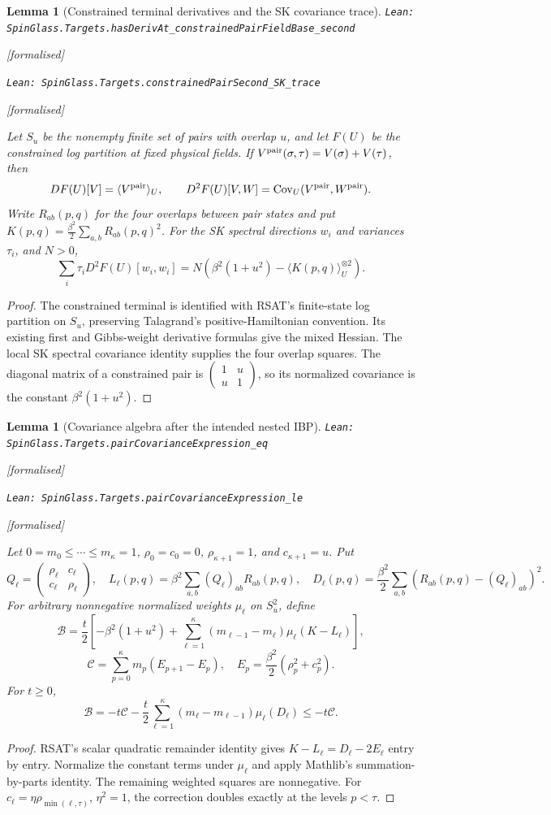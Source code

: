 \documentclass[11pt]{article}
\providecommand{\lean}[1]{\leavevmode\par\nopagebreak
  {\noindent\normalfont\footnotesize\raggedright\texttt{Lean: #1}\par}\nopagebreak}
\providecommand{\leanok}{\par\nopagebreak
  {\noindent\normalfont\footnotesize\textcolor{green!50!black}{[formalised]}\par}\nopagebreak}
\newtheorem{lemma}[theorem]{Lemma}
\begin{document}
\begin{lemma}[Constrained terminal derivatives and the SK covariance trace]
\lean{SpinGlass.Targets.hasDerivAt\_constrainedPairFieldBase\_second}\leanok
\lean{SpinGlass.Targets.constrainedPairSecond\_SK\_trace}\leanok
Let $S_u$ be the nonempty finite set of pairs with overlap $u$, and let $F(U)$
be the constrained log partition at fixed physical fields. If
$V^{\rm pair}(\sigma,\tau)=V(\sigma)+V(\tau)$, then
\[
D F(U)[V]=\langle V^{\rm pair}\rangle_U,\qquad
D^2 F(U)[V,W]=\operatorname{Cov}_U(V^{\rm pair},W^{\rm pair}).
\]
Write $R_{ab}(p,q)$ for the four overlaps between pair states and put
$K(p,q)=\frac{\beta^2}{2}\sum_{a,b}R_{ab}(p,q)^2$.
For the SK spectral directions $w_i$ and variances $\tau_i$, and $N>0$,
\[
\sum_i\tau_i D^2F(U)[w_i,w_i]
=N\left(\beta^2(1+u^2)-\langle K(p,q)\rangle_U^{\otimes2}\right).
\]
\end{lemma}
\begin{proof}
The constrained terminal is identified with RSAT's finite-state log partition
on $S_u$, preserving Talagrand's positive-Hamiltonian convention. Its existing
first and Gibbs-weight derivative formulas give the mixed Hessian. The local
SK spectral covariance identity supplies the four overlap squares. The diagonal
matrix of a constrained pair is $\left(\begin{smallmatrix}1&u\\u&1\end{smallmatrix}\right)$,
so its normalized covariance is the constant $\beta^2(1+u^2)$.
\end{proof}

\begin{lemma}[Covariance algebra after the intended nested IBP]
\lean{SpinGlass.Targets.pairCovarianceExpression\_eq}\leanok
\lean{SpinGlass.Targets.pairCovarianceExpression\_le}\leanok
Let $0=m_0\le\cdots\le m_\kappa=1$, $\rho_0=c_0=0$,
$\rho_{\kappa+1}=1$, and $c_{\kappa+1}=u$. Put
\[
Q_\ell=\begin{pmatrix}\rho_\ell&c_\ell\\c_\ell&\rho_\ell\end{pmatrix},\quad
L_\ell(p,q)=\beta^2\sum_{a,b}(Q_\ell)_{ab}R_{ab}(p,q),\quad
D_\ell(p,q)=\frac{\beta^2}{2}\sum_{a,b}(R_{ab}(p,q)-(Q_\ell)_{ab})^2.
\]
For arbitrary nonnegative normalized weights $\mu_\ell$ on $S_u^2$, define
\[
\mathcal B=\frac t2\left[-\beta^2(1+u^2)
 +\sum_{\ell=1}^{\kappa}(m_{\ell-1}-m_\ell)\mu_\ell(K-L_\ell)\right],
\]
\[
\mathcal C=\sum_{p=0}^{\kappa}m_p(E_{p+1}-E_p),\quad
E_p=\frac{\beta^2}{2}(\rho_p^2+c_p^2).
\]
For $t\ge0$,
\[
\mathcal B=-t\mathcal C-\frac t2\sum_{\ell=1}^{\kappa}
 (m_\ell-m_{\ell-1})\mu_\ell(D_\ell)\le-t\mathcal C.
\]
\end{lemma}
\begin{proof}
RSAT's scalar quadratic remainder identity gives
$K-L_\ell=D_\ell-2E_\ell$ entry by entry. Normalize the constant terms under
$\mu_\ell$ and apply Mathlib's summation-by-parts identity. The remaining
weighted squares are nonnegative. For $c_\ell=\eta\rho_{\min(\ell,\tau)}$,
$\eta^2=1$, the correction doubles exactly at the levels $p<\tau$.
\end{proof}
\end{document}

